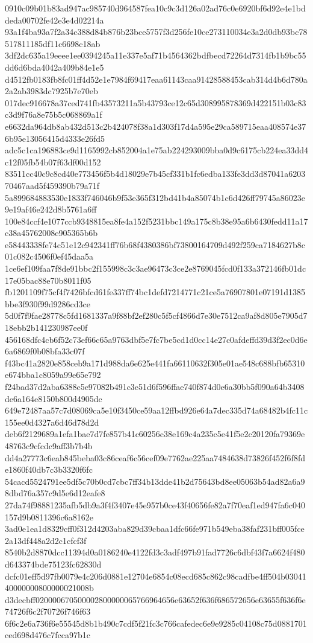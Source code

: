 {0910c09b01b83ad947ac985740d964587fea10c9c3d126a02ad76c0e6920bf6d92e4e1bddeda00702fe42e3e4d02214a
93a1f4ba93a7f2a34c388d84b876b23bce5757f3d256fe10ce273110034e3a2d0db93bc78517811185df11c6698c18ab
3df2dc635a19eeee1ee0394245a11e337e5af71b4564362bdfbecd72264d7314fb1b9bc55dd6d6bda4042a409b84e1e5
d4512fb0183fb8fc01ff4d52e1e7984f69417eaa61143caa91428588453cab314d4b6d780a2a2ab3983dc7925b7e70eb
017dec916678a37ced741fb43573211a5b43793ce12c65d308995878369d422151b03c83c3d9f76a8e75b5c068869a1f
e6632da964db8ab432d513c2b424078f38a1d303f17d4a595e29ca589715eaa408574e376b95e13056415d4333e26fd5
adc5c1ca196883ce9d1165992cb852004a1e75ab224293009bba0d9c6175cb224ea33dd4c12f05fb54b07f63df00d152
83511cc40c9c8cd40e773456f5b4d18029e7b45cf331b1fc6edba133fe3dd3d87041a620370467aad5f459390b79a71f
5a899684883530e1833f746046b9f53e365f312bd41b4a85074b1c6d426ff79745a86023e9e19af46e242d8b5761a6ff
100e84ccf4e1077ccb9348815ea8fe4a152f5231bbc149a175c8b38e95a6b6430fedd11a17c38a45762008e905365b6b
e58443338fe74c51e12c942341ff76b68f4380386bf73800164709d492f259ca7184627b8c01c082c4506f0ef45daa5a
1ce6ef109faa7f8de91bbc2f155998c3c3ae96473c3ce2e8769045fcd0f133a372146fb01dc17e05bac88e70b8011f05
fb1201109f75cf4f7426bfcd61fe337ff74bc1defd7214771c21ce5a76907801e07191d1385bbe3f930f99d9286cd3ce
5d0f7f9fae28778c5fd1681337a9f88bf2ef280c5f5cf4866d7e30e7512ca9af8d805e7905d718ebb2b141230987ee0f
456168dfc4cb6f52c73ef66c65a9763dbf5e7fc7be5cd1d0cc14e27c0afdeffd39d3f2ec0d6e6a6869f0b08bfa33c07f
f43bc41a2820e858ceb9a171d988da6e625e441fa66110632f305e01ae548c688bfb65310e674bba1c8059a99e65e792
f24bad37d2aba6388c5e97082b491c3e51d6f596ffae740f874d0e6a30bb5f090a64b3408de6a164e8150b800d4905dc
649e72487aa57c7d08069ca5e10f3450ce59aa12ffbd926e64a7dec335d74a68482b4fc11c155ee0d4327a6d46d78d2d
deb6f2129689a1efa1bae7d7fe857b41c60256c38e169c4a235c5e41f5e2c20120fa79369e48763c9cfcdc9aff3b7b4b
dd4a27773c6eab845beba03c86ceaf6c56cef09e7762ae225aa7484638d73826f452f6f8fde1860f40db7c3b3320f6fc
54cacd5524791ee5df5c70b0cd7cbc7ff34b13dde41b2d75643bd8ee05063b54ad82a6a98dbd76a357c9d5e6d12eafe8
27da74f98881235afb5db9a3f4f3407e45e957b0ce43f40656fe82a7f70eaf1ed947fa6c040157d9b0811396c6a8162e
3ad0e1ea1d8329cff0f312d4203aba829d39cbaa1dfc66fe971b549eba38faf231bff005fce2a13df448a2d2c1cfcf3f
8540b2d8870dcc11394d0a0186240e4122fd3c3adf497b91fad7726c6dbf43f7a6624f480d643374bde75123fc62830d
dcfc01eff5d97fb0079e4c206d0881e12704e6854c08ecd685c862c98cadfbe4ff504b0304140000000800000021008b
d3decbff020000670500002800000065766964656e63652f636f686572656e63655f636f6e74726f6c2f70726f746f63
6f6c2e6a736f6e55545d8b1b490c7cdf5f21fc3c766cafedec6e9e9285c04108c75d0881701ced698d476c7fcca97b1c
}
